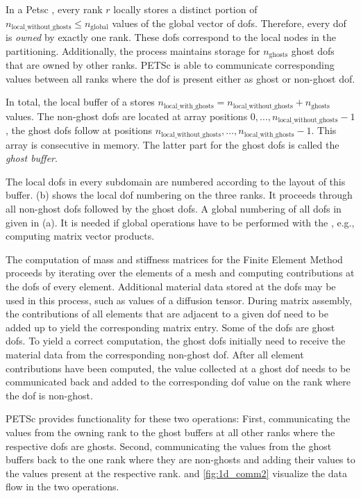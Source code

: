 In a Petsc \Vec{}, every rank $r$ locally stores a distinct portion of $n_\text{local\_without\_ghosts} \leq n_\text{global}$ values of the global vector of dofs. Therefore, every dof is \emph{owned} by exactly one rank. These dofs correspond to the local nodes in the partitioning.
Additionally, the process maintains storage for $n_\text{ghosts}$ ghost dofs that are owned by other ranks. 
PETSc is able to communicate corresponding values between all ranks where the dof is present either as ghost or non-ghost dof. 

In total, the local buffer of a \Vec{} stores $n_\text{local\_with\_ghosts} = n_\text{local\_without\_ghosts} + n_\text{ghosts}$ values. The non-ghost dofs are located at array positions $0,\dots,n_\text{local\_without\_ghosts}-1$, the ghost dofs follow at positions $n_\text{local\_without\_ghosts}, \dots, n_\text{local\_with\_ghosts}-1$. This array is consecutive in memory. The latter part for the ghost dofs is called the \emph{ghost buffer}. 

The local dofs in every subdomain are numbered according to the layout of this buffer.  (b) shows the local dof numbering on the three ranks. It proceeds through all non-ghost dofs followed by the ghost dofs. A global numbering of all dofs in given in  (a). It is needed if global operations have to be performed with the \Vec{}, e.g., computing matrix vector products.

The computation of mass and stiffness matrices for the Finite Element Method proceeds by iterating over the elements of a mesh and computing contributions at the dofs of every element. Additional material data stored at the dofs may be used in this process, such as values of a diffusion tensor. During matrix assembly, the contributions of all elements that are adjacent to a given dof need to be added up to yield the corresponding matrix entry.
Some of the dofs are ghost dofs. To yield a correct computation, the ghost dofs initially need to receive the material data from the corresponding non-ghost dof. After all element contributions have been computed, the value collected at a ghost dof needs to be communicated back and added to the corresponding dof value on the rank where the dof is non-ghost.

PETSc provides functionality for these two operations: First, communicating the values from the owning rank to the ghost buffers at all other ranks where the respective dofs are ghosts. Second, communicating the values from the ghost buffers back to the one rank where they are non-ghosts and adding their values to the values present at the respective rank.  and \cref{fig:1d_comm2} visualize the data flow in the two operations. 

